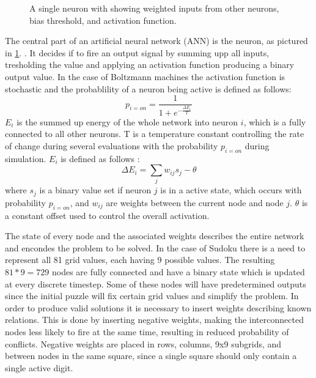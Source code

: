 \documentclass[a4paper,11pt]{kth-mag}
\begin{document}
\begin{figure}[here] 
\noindent{}
\caption{A single neuron with showing weighted inputs from other neurons, bias threshold, and activation function.}
\label{fig:neural-Neuron}
\end{figure}
The central part of an artificial neural network (ANN) is the neuron, as pictured in \ref{fig:neural-Neuron}. .
It decides if to fire an output signal by summing upp all inputs, tresholding the value and applying an activation function producing a binary output value.
In the case of Boltzmann machines the activation function is stochastic and the probablility of a neuron being active is defined as follows:
\[
p_{i=on} = \frac{1}{1+e^{-\frac{\Delta E_{i}}{T}}}
\]
$E_i$ is the summed up energy of the whole network into neuron $i$, which is a fully connected to all other neurons.
T is a temperature constant controlling the rate of change during several evaluations with the probability $p_{i=on}$ during simulation.
$E_i$ is defined as follows \cite{boltzmann2}:
\[
\Delta E_{i} = \sum_{j} w_{ij} s_{j} - \theta
\]
where $s_j$ is a binary value set if neuron $j$ is in a active state, which occurs with probability $p_{i=on}$, and $w_{ij}$ are weights between the current node and node $j$. $\theta$ is a constant offset used to control the overall activation.

The state of every node and the associated weights describes the entire network and encondes the problem to be solved.
In the case of Sudoku there is a need to represent all 81 grid values, each having 9 possible values.
The resulting $81*9=729$ nodes are fully connected and have a binary state which is updated at every discrete timestep.
Some of these nodes will have predetermined outputs since the initial puzzle will fix certain grid values and simplify the problem.
In order to produce valid solutions it is necessary to insert weights describing known relations.
This is done by inserting negative weights, making the interconnected nodes less likely to fire at the same time, resulting in reduced probability of conflicts.
Negative weights are placed in rows, columns, 9x9 subgrids, and between nodes in the same square, since a single square should only contain a single active digit.\\
\end{document}
